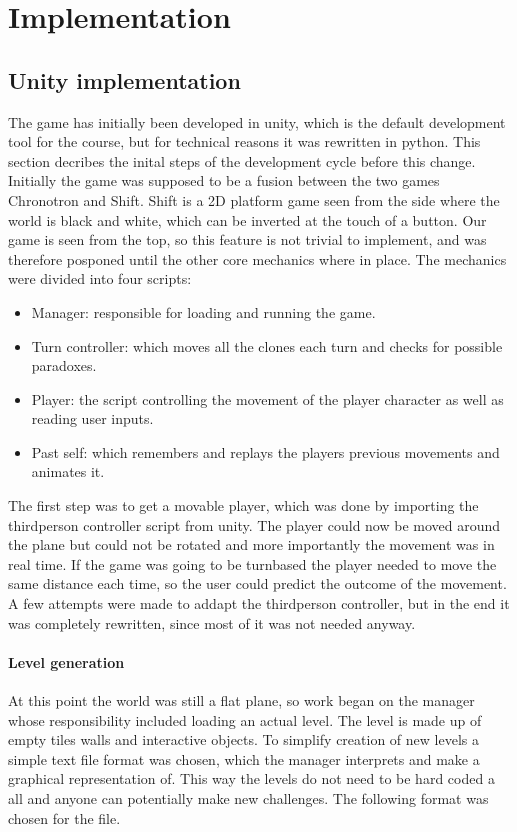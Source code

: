 \section{Implementation}
\subsection{Unity implementation}
The game has initially been developed in unity, which is the default development tool for the course, but for technical reasons it was rewritten in python. This section decribes the inital steps of the development cycle before this change.
Initially the game was supposed to be a fusion between the two games Chronotron and Shift. Shift is a 2D platform game seen from the side where the world is black and white, which can be inverted at the touch of a button. Our game is seen from the top, so this feature is not trivial to implement, and was therefore posponed until the other core mechanics where in place.
The mechanics were divided into four scripts:\\

\begin{itemize}
\item Manager: responsible for loading and running the game.
\item Turn controller: which moves all the clones each turn and checks for possible paradoxes.
\item Player: the script controlling the movement of the player character as well as reading user inputs.
\item Past self: which remembers and replays the players previous movements and animates it.
\end{itemize}

The first step was to get a movable player, which was done by importing the thirdperson controller script from unity. The player could now be moved around the plane but could not be rotated and more importantly the movement was in real time. If the game was going to be turnbased the player needed to move the same distance each time, so the user could predict the outcome of the movement. A few attempts were made to addapt the thirdperson controller, but in the end it was completely rewritten, since most of it was not needed anyway. \\
\paragraph {Level generation} At this point the world was still a flat plane, so work began on the manager whose responsibility included loading an actual level. The level is made up of empty tiles walls and interactive objects. To simplify creation of new levels a simple text file format was chosen, which the manager interprets and make a graphical representation of. This way the levels do not need to be hard coded a all and anyone can potentially make new challenges. The following format was chosen for the file.

